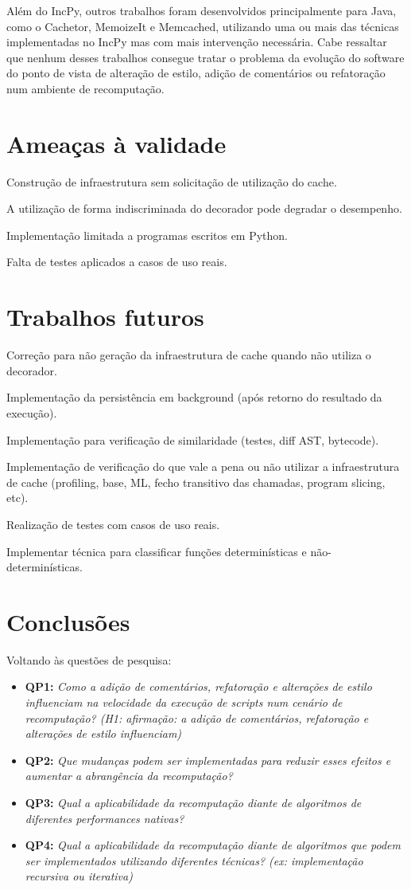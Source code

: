 \documentclass[sigconf]{acmart}
\begin{document}
Além do IncPy, outros trabalhos foram desenvolvidos principalmente para Java, como o Cachetor\cite{nguyen2013cachetor}, MemoizeIt\cite{della2015performance} e Memcached\cite{fitzpatrick2004distributed}, utilizando uma ou mais das técnicas implementadas no IncPy mas com mais intervenção necessária. Cabe ressaltar que nenhum desses trabalhos consegue tratar o problema da evolução do software do ponto de vista de alteração de estilo, adição de comentários ou refatoração num ambiente de recomputação.

\section{Ameaças à validade}
Construção de infraestrutura sem solicitação de utilização do cache.

A utilização de forma indiscriminada do decorador pode degradar o desempenho.

Implementação limitada a programas escritos em Python.

Falta de testes aplicados a casos de uso reais.

\section{Trabalhos futuros}
Correção para não geração da infraestrutura de cache quando não utiliza o decorador.

Implementação da persistência em background (após retorno do resultado da execução).

Implementação para verificação de similaridade (testes, diff AST, bytecode).

Implementação de verificação do que vale a pena ou não utilizar a infraestrutura de cache (profiling, base, ML, fecho transitivo das chamadas, program slicing, etc).

Realização de testes com casos de uso reais.

Implementar técnica para classificar funções determinísticas e não-determinísticas.

\section{Conclusões}
Voltando às questões de pesquisa:
\begin{itemize}
\item \textbf{QP1:} {\textit{Como a adição de comentários, refatoração e alterações de estilo influenciam na velocidade da execução de scripts num cenário de recomputação? (H1: afirmação: a adição de comentários, refatoração e alterações de estilo influenciam)}}
\item \textbf{QP2:} {\textit{Que mudanças podem ser implementadas para reduzir esses efeitos e aumentar a abrangência da recomputação?}}
\item \textbf{QP3:} {\textit{Qual a aplicabilidade da recomputação diante de algoritmos de diferentes performances nativas?}}
\item \textbf{QP4:} {\textit{Qual a aplicabilidade da recomputação diante de algoritmos que podem ser implementados utilizando diferentes técnicas? (ex: implementação recursiva ou iterativa)}}
\end{itemize}
\end{document}

